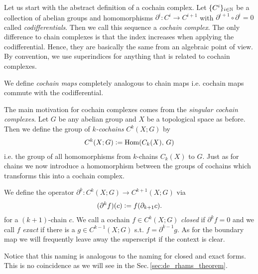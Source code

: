 \documentclass[../master_thesis.tex]{subfiles}
\begin{document}
Let us start with the abstract definition of a cochain complex.
Let $\{ C^i \}_{i\in \mathbb{N}}$ be a collection of abelian groups
and homomorphisms $\partial^i: C^i \rightarrow C^{i+1}$ with 
$\partial^{i+1} \circ \partial^i = 0$ called \textit{codifferentials}. 
Then we call this sequence a 
\textit{cochain complex}. The only difference to chain complexes
is that the index 
increases when applying the codifferential. Hence, they are 
basically the same from an algebraic point of view.
By convention, 
we use superindices for anything that is related to cochain complexes. 

We define \textit{cochain maps} completely analogous to chain maps 
i.e. cochain maps commute with the codifferential.

The main motivation for cochain complexes comes from the 
\textit{singular cochain complexes}.
Let $G$ be any abelian group and $X$ be a topological space as before. 
Then we define the group 
of \textit{$k$-cochains} $C^k(X;G)$ by
\begin{align*}
    C^k(X;G) \vcentcolon= \text{Hom}(C_k(X),\,G)
\end{align*}
i.e. the group of all homomorphisms from $k$-chains $C_k(X)$ to $G$. 
Just as for chains we now introduce a homomorphism between the groups of cochains
which transforms this into a cochain complex.
\begin{definition}[Coboundary ]
    We define the operator $\partial^k: C^k(X;G) \rightarrow C^{k+1}(X;G)$ via
    \begin{align*}
        (\partial^k f) (c) \vcentcolon= f(\partial_{k+1} c).
    \end{align*}
    for a $(k+1)$-chain $c$.
    We call a cochain $f \in C^k(X;G)$ \textit{closed} if $\partial^k f = 0$ 
    and we call $f$
    \textit{exact} if there is a $g \in C^{k-1}(X;G)$ s.t. $f = \partial^{k-1} g$.
    As for the boundary map we will frequently leave away the superscript if
    the context is clear.
\end{definition}
Notice that this naming is analogous to the naming for closed and exact forms. 
This is no coincidence as we will see in the Sec.\,\ref{sec:de_rhams_theorem}.
\end{document}
